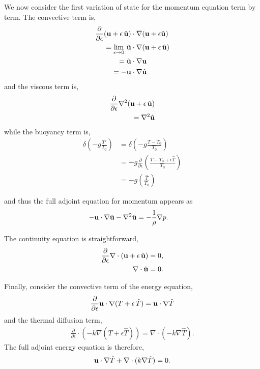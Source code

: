 We now consider the first variation of state for the momentum equation
term by term. The convective term is, 
\begin{align}
 \frac{\partial}{\partial \epsilon} ({\bf u} + \epsilon \, \hat {\bf u}) &\cdot \nabla
  ({\bf u} + \epsilon \hat {\bf u}) \\
 = \lim_{\epsilon \to 0} \, \hat {\bf u} &\cdot \nabla ({\bf u} + \epsilon \,\hat {\bf u}) \\
 = \hat {\bf u} & \cdot \nabla {\bf u} \\
 = - {\bf u} &\cdot \nabla \hat {\bf u}
\end{align}
and the viscous term is, 
\begin{align}
 \frac{\partial}{\partial \epsilon} \nabla^2 ({\bf u} + \epsilon \, \hat {\bf u}) \\
 = \nabla^2 \hat {\bf u}
\end{align}
while the buoyancy term is, 
\begin{align}
 \delta \left(-g \frac{T'}{T_0}\right) &= \delta \left( -g
 \frac{T-T_0}{T_0} \right) \\
 &= -g \frac{\partial}{\partial \epsilon} \left( \frac{T-T_0+\epsilon
 \hat T}{T_0} \right) \\
 &= -g \left( \frac{\hat T}{T_0} \right) 
\end{align}


and thus the full adjoint equation for momentum appears as
\begin{align}
 - {\bf u} &\cdot \nabla \hat {\bf u} - \nabla^2 \hat {\bf u} = -\frac{1}{\rho} \nabla p. 
\label{eq_adjmom}
\end{align}

The continuity equation is straightforward, 
\begin{align}
 \frac{\partial}{\partial \epsilon} \nabla \cdot ({\bf u} + \epsilon \,
 \hat {\bf u}) &= 0, \\
\nabla \cdot \hat {\bf u} &= 0.
\label{eq_adjcont}
\end{align}

Finally, consider the convective term of the energy equation, 
\begin{align}
 \frac{\partial}{\partial \epsilon} {\bf u} \cdot \nabla (T + \epsilon
 \, \hat T)
 = {\bf u} \cdot \nabla \hat T
\end{align}
and the thermal diffusion term, 
\begin{align}
 \frac{\partial}{\partial \epsilon} \cdot (-k \nabla (T + \epsilon \hat
 T)) = \nabla \cdot (-k \nabla \hat T).
\end{align}
The full adjoint energy equation is therefore, 
\begin{align}
 {\bf u} \cdot \nabla \hat T + \nabla \cdot (k \nabla \hat T) = 0.
\label{eq_adjen}
\end{align}

